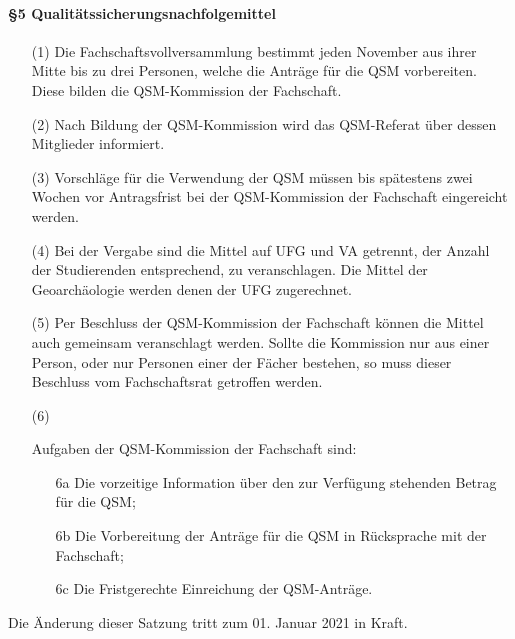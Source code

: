     \paragraph{§5 Qualitätssicherungsnachfolgemittel}
    \begin{enumerate}
        \item[(1)] {Die Fachschaftsvollversammlung bestimmt jeden November aus ihrer Mitte bis zu        drei Personen, welche die Anträge für die QSM vorbereiten. Diese bilden die        QSM-Kommission der Fachschaft.}
        \item[(2)] {Nach Bildung der QSM-Kommission wird das QSM-Referat über dessen Mitglieder        informiert.}
        \item[(3)] {Vorschläge für die Verwendung der QSM müssen bis spätestens zwei Wochen vor        Antragsfrist bei der QSM-Kommission der Fachschaft eingereicht werden.}
        \item[(4)] {Bei der Vergabe sind die Mittel auf UFG und VA getrennt, der Anzahl der        Studierenden entsprechend, zu veranschlagen. Die Mittel der Geoarchäologie werden        denen der UFG zugerechnet.}
        \item[(5)] {Per Beschluss der QSM-Kommission der Fachschaft können die Mittel auch gemeinsam        veranschlagt werden. Sollte die Kommission nur aus einer Person, oder nur Personen        einer der Fächer bestehen, so muss dieser Beschluss vom Fachschaftsrat getroffen        werden.}
        \item[(6)] {Aufgaben der QSM-Kommission der Fachschaft sind:
            \begin{enumerate}
                \item[6a]Die vorzeitige Information über den zur Verfügung stehenden Betrag für die QSM;
                \item[6b]Die Vorbereitung der Anträge für die QSM in Rücksprache mit der Fachschaft;
                \item[6c]Die Fristgerechte Einreichung der QSM-Anträge.  
            \end{enumerate}
        }
    \end{enumerate}
    Die Änderung dieser Satzung tritt zum 01. Januar 2021 in Kraft.
